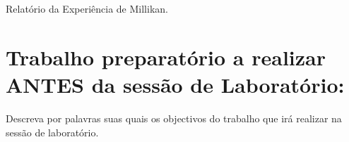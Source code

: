 \documentclass[a4paper,12pt]{article}  %
\author{Prof. Bernardo B. Carvalho}
\date{ Setembro 2017}
\newcommand{\HRule}{\rule{\linewidth}{0.5mm}}
\begin{document}
 



{  \sf  Relatório da Experiência de Millikan.} %



\section{\sf Trabalho preparatório a realizar  ANTES da sessão de Laboratório:}
Descreva por palavras suas quais os objectivos do trabalho que irá realizar na sessão de laboratório.

\end{document}
